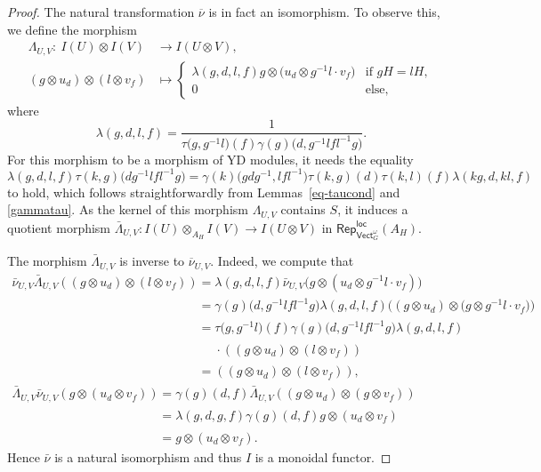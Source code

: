 \documentclass[10pt,a4paper]{amsart}
\numberwithin{equation}{section}
\newcommand{\ov}[1]{\overline{#1}}
\newcommand{\locmod}{\mathsf{Rep}^{\mathsf{loc}}}
\newcommand{\Vect}{\mathsf{Vect}}
\newcommand{\rI}{I}
\begin{document}
\begin{proof}
The natural transformation $\ov{\nu}$ is in fact an isomorphism. To observe this, we define the morphism
\begin{align*}
 \Lambda_{U,V} \colon\ \rI(U) \otimes \rI(V) &\longrightarrow \rI(U \otimes V), \\
 (g \otimes u_d) \otimes (l \otimes v_f) &\mapsto
 \begin{cases}
 \lambda(g,d,l,f) g \otimes \big(u_d \otimes g^{-1}l \cdot v_f\big) & \text{if } gH=lH,\\
 0 & \text{else},
 \end{cases}
\end{align*}
where
\[\lambda(g,d,l,f) =\frac{1}{ \tau\big(g,g^{-1}l\big)(f)\gamma(g)\big(d,g^{-1}lfl^{-1}g\big)}. \]
For this morphism to be a morphism of YD modules, it needs the equality
\[
\lambda(g,d,l,f)\tau(k,g)\big(dg^{-1}lfl^{-1}g\big) = \gamma(k)\big(gdg^{-1},lfl^{-1}\big)\tau(k,g)(d)\tau(k,l)(f)\lambda(kg,d,kl,f)
\]
to hold, which follows straightforwardly from Lemmas~\ref{eq-taucond} and \ref{gammatau}. As the kernel of this morphism $\Lambda_{U,V}$ contains $S$, it induces a quotient morphism $\bar{\Lambda}_{U,V}\colon \rI(U) \otimes_{A_H} \rI(V) \to \rI(U \otimes V)$ in $\locmod_{\Vect_G^\omega}(A_H)$.


{\samepage The morphism $\bar{\Lambda}_{U,V}$ is inverse to $\ov{\nu}_{U,V}$. Indeed, we compute that
\begin{gather*}
 \bar{\nu}_{U,V}\bar{\Lambda}_{U,V}((g\otimes u_d) \otimes (l \otimes v_f)) = \lambda(g,d,l,f)\bar{\nu}_{U,V}\big(g \otimes (u_d \otimes g^{-1}l\cdot v_f)\big) \\
 \phantom{\bar{\nu}_{U,V}\bar{\Lambda}_{U,V}((g\otimes u_d) \otimes (l \otimes v_f)) }{}=\gamma(g)\big(d,g^{-1}lfl^{-1}g\big)\lambda(g,d,l,f)\big((g \otimes u_d) \otimes \big(g \otimes g^{-1}l\cdot v_f\big)\big)\\
\phantom{\bar{\nu}_{U,V}\bar{\Lambda}_{U,V}((g\otimes u_d) \otimes (l \otimes v_f)) }{} =\tau\big(g,g^{-1}l\big)(f)\gamma(g)\big(d,g^{-1}lfl^{-1}g\big)\lambda(g,d,l,f)\\
\phantom{\bar{\nu}_{U,V}\bar{\Lambda}_{U,V}((g\otimes u_d) \otimes (l \otimes v_f))= }{} \cdot ((g \otimes u_d) \otimes (l \otimes v_f))\\
\phantom{\bar{\nu}_{U,V}\bar{\Lambda}_{U,V}((g\otimes u_d) \otimes (l \otimes v_f)) }{} =((g \otimes u_d) \otimes (l \otimes v_f)),\\
 \bar{\Lambda}_{U,V}\bar{\nu}_{U,V}(g \otimes (u_d \otimes v_f)) =\gamma(g)(d,f) \bar{\Lambda}_{U,V}((g \otimes u_d) \otimes (g \otimes v_f)) \\
\phantom{\bar{\Lambda}_{U,V}\bar{\nu}_{U,V}(g \otimes (u_d \otimes v_f))}{} = \lambda(g,d,g,f)\gamma(g)(d,f)g \otimes (u_d \otimes v_f)\\
\phantom{\bar{\Lambda}_{U,V}\bar{\nu}_{U,V}(g \otimes (u_d \otimes v_f))}{} = g \otimes (u_d \otimes v_f).
\end{gather*}
Hence $\bar{\nu}$ is a natural isomorphism and thus $I$ is a monoidal functor.}


\end{proof}
\end{document}
